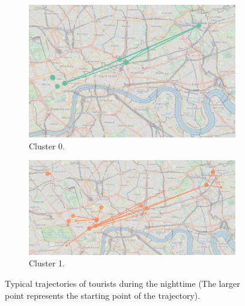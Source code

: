 \documentclass{article}
\theoremstyle{remark}
\begin{document}
\begin{figure}[!h]

\centering
\begin{subfigure}{0.6\textheight}
\centering
\includegraphics[width=0.4\linewidth]{figures/nighttime_tourists_c0.png}
\caption{Cluster 0.}
\label{fig:nighttime_tourists_c0}
\end{subfigure}
\begin{subfigure}{0.6\textheight}
\centering
\includegraphics[width=0.4\linewidth]{figures/nighttime_tourists_c1.png}
\caption{Cluster 1.}
\label{fig:nighttime_tourists_c1}
\end{subfigure}

\caption{Typical trajectories of tourists during the nighttime (The larger point represents the starting point of the trajectory).}
\label{fig:sequences_nighttime_tourists}
\end{figure}
\end{document}
